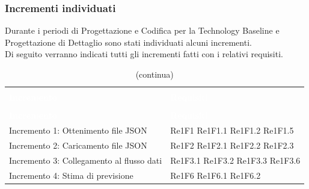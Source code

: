 \subsubsection{Incrementi individuati}
Durante i periodi di Progettazione e Codifica per la Technology Baseline e Progettazione di Dettaglio sono stati individuati alcuni incrementi. \\
Di seguito verranno indicati tutti gli incrementi fatti con i relativi requisiti.


\begin{longtable}{C{4cm} L{3cm}}
\caption{Tracciamento incrementi} \\
\textcolor{white}{\textbf{Incremento}} &
\textcolor{white}{\textbf{Requisiti}} \\
		\endfirsthead
		\caption[]{(continua)} \\
\textcolor{white}{\textbf{Incremento}} &
\textcolor{white}{\textbf{Requisiti}} \\
		\endhead
Incremento 1: Ottenimento file JSON			& Re1F1 \newline Re1F1.1  \newline Re1F1.2 \newline Re1F1.5\\
Incremento 2: Caricamento file JSON			& Re1F2 \newline Re1F2.1 \newline Re1F2.2 \newline Re1F2.3\\
Incremento 3: Collegamento al flusso dati	& Re1F3.1 \newline Re1F3.2 \newline Re1F3.3 \newline Re1F3.6 \\
Incremento 4: Stima di previsione			& Re1F6 \newline Re1F6.1 \newline Re1F6.2\\
\end{longtable}